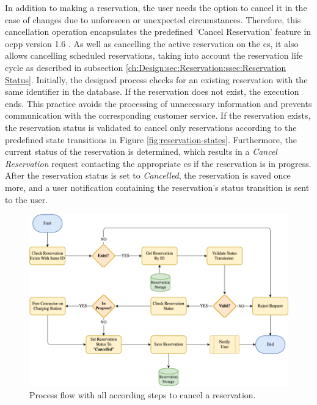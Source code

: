 In addition to making a reservation, the user needs the option to cancel it in the case of changes due to unforeseen or unexpected circumstances.
Therefore, this cancellation operation encapsulates the predefined 'Cancel Reservation' feature in \acrshort{ocpp} version 1.6 \cite{noauthor_ocpp_nodate}. As well as cancelling the active reservation on the \acrshort{cs}, it also allows cancelling scheduled reservations, taking into account the reservation life cycle as described in subsection \ref{ch:Design:sec:Reservation:ssec:Reservation Status}.
Initially, the designed process checks for an existing reservation with the same identifier in the database. If the reservation does not exist, the execution ends. This practice avoids the processing of unnecessary information and prevents communication with the corresponding customer service.
If the reservation exists, the reservation status is validated to cancel only reservations according to the predefined state transitions in Figure \ref{fig:reservation-states}. Furthermore, the current status of the reservation is determined, which results in a \textit{Cancel Reservation} request contacting the appropriate \acrshort{cs} if the reservation is in progress.
After the reservation status is set to \textit{Cancelled}, the reservation is saved once more, and a user notification containing the reservation's status transition is sent to the user.

\begin{figure}[h]
    \centering
    \includegraphics[scale=0.4]{resources/images/main/5_design/processes/ReservationCancel.png}
    \caption{Process flow with all according steps to cancel a reservation.}
    \label{fig:cancel-reservation-flowchart}
\end{figure}

